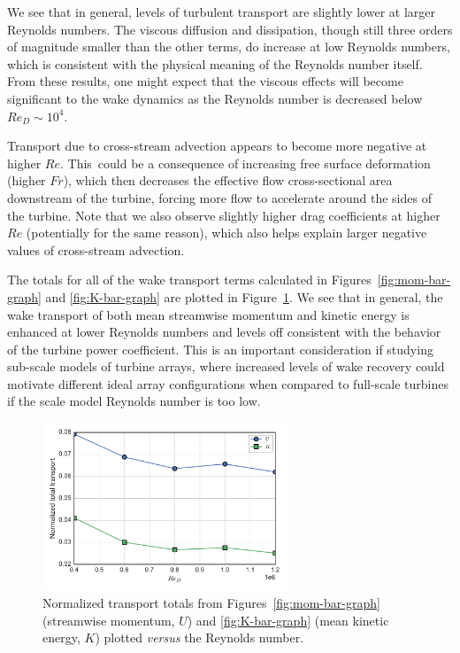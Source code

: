\documentclass[energies,article,accept,moreauthors,pdftex,10pt,a4paper]{mdpi}
\theoremstyle{mdpi}
\newcounter{ex}
\newcounter{re}
\begin{document}
We see that in general, levels of turbulent transport are slightly lower at
larger Reynolds numbers. The viscous diffusion and dissipation, though still
three orders of magnitude smaller than the other terms, do increase at low
Reynolds numbers, which is consistent with the physical meaning of the Reynolds
number itself. From these results, one might expect that the viscous effects
will become significant to the wake dynamics as the Reynolds number is decreased
below $Re_D \sim 10^4$.

Transport due to cross-stream advection appears to become more negative at
higher $Re$. This~could be a consequence of increasing free surface deformation
(higher $Fr$), which then decreases the effective flow cross-sectional area
downstream of the turbine, forcing more flow to accelerate around the sides of
the turbine. Note that we also observe slightly higher drag coefficients at
higher $Re$ (potentially for the same reason), which also helps explain larger
negative values of cross-stream advection.

The totals for all of the wake transport terms calculated in
Figures~\ref{fig:mom-bar-graph} and \ref{fig:K-bar-graph} are plotted in
Figure~\ref{fig:wake-trans-totals}. We see that in general, the wake transport
of both mean streamwise momentum and kinetic energy is enhanced at lower
Reynolds numbers and levels off consistent with the behavior of the turbine
power coefficient. This is an important consideration if studying sub-scale
models of turbine arrays, where increased levels of wake recovery could motivate
different ideal array configurations when compared to full-scale turbines if the
scale model Reynolds number is too low.

\begin{figure}[H]
    \centering

    \includegraphics[width=0.65\textwidth]{figures/wake_trans_totals}

    \caption{Normalized transport totals from Figures~\ref{fig:mom-bar-graph}
        (streamwise momentum, $U$) and \ref{fig:K-bar-graph} (mean kinetic energy,
        $K$) plotted \textit{versus} the Reynolds number.}
    
    \label{fig:wake-trans-totals}
\end{figure}
\end{document}
